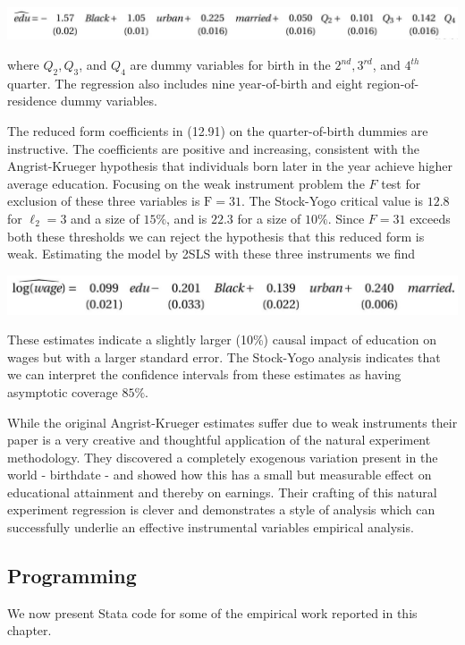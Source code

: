 \documentclass[10pt]{article}
\begin{document}
\includegraphics[max width=\textwidth]{2022_09_17_f9391324ededdbb7a34eg-73(1)}

where $Q_{2}, Q_{3}$, and $Q_{4}$ are dummy variables for birth in the $2^{n d}, 3^{r d}$, and $4^{t h}$ quarter. The regression also includes nine year-of-birth and eight region-of-residence dummy variables.

The reduced form coefficients in (12.91) on the quarter-of-birth dummies are instructive. The coefficients are positive and increasing, consistent with the Angrist-Krueger hypothesis that individuals born later in the year achieve higher average education. Focusing on the weak instrument problem the $F$ test for exclusion of these three variables is $\mathrm{F}=31$. The Stock-Yogo critical value is $12.8$ for $\ell_{2}=3$ and a size of $15 \%$, and is $22.3$ for a size of $10 \%$. Since $F=31$ exceeds both these thresholds we can reject the hypothesis that this reduced form is weak. Estimating the model by 2SLS with these three instruments we find

\includegraphics[max width=\textwidth]{2022_09_17_f9391324ededdbb7a34eg-74}

These estimates indicate a slightly larger (10\%) causal impact of education on wages but with a larger standard error. The Stock-Yogo analysis indicates that we can interpret the confidence intervals from these estimates as having asymptotic coverage $85 \%$.

While the original Angrist-Krueger estimates suffer due to weak instruments their paper is a very creative and thoughtful application of the natural experiment methodology. They discovered a completely exogenous variation present in the world - birthdate - and showed how this has a small but measurable effect on educational attainment and thereby on earnings. Their crafting of this natural experiment regression is clever and demonstrates a style of analysis which can successfully underlie an effective instrumental variables empirical analysis.

\subsection{Programming}
We now present Stata code for some of the empirical work reported in this chapter.
\end{document}
